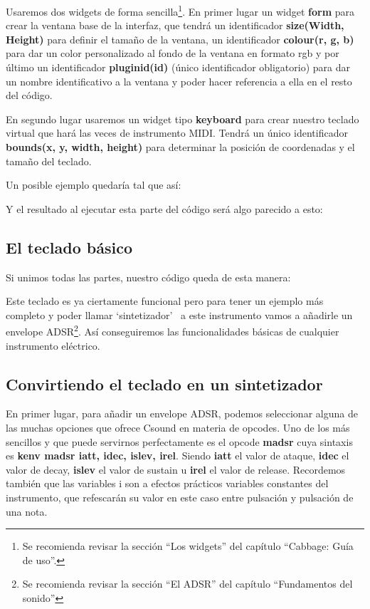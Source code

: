 Usaremos dos widgets de forma sencilla\footnote{Se recomienda revisar la sección ``Los widgets'' del capítulo ``Cabbage: Guía de uso''.}. En primer lugar un widget \textbf{form} para crear la ventana base de la interfaz, que tendrá un identificador \textbf{size(Width, Height)} para definir el tamaño de la ventana, un identificador \textbf{colour(r, g, b)} para dar un color personalizado al fondo de la ventana en formato rgb y por último un identificador \textbf{pluginid(id)} (único identificador obligatorio) para dar un nombre identificativo a la ventana y poder hacer referencia a ella en el resto del código.

En segundo lugar usaremos un widget tipo \textbf{keyboard} para crear nuestro teclado virtual que hará las veces de instrumento MIDI. Tendrá un único identificador \textbf{bounds(x, y, width, height)} para determinar la posición de coordenadas y el tamaño del teclado.

Un posible ejemplo quedaría tal que así:


\pagebreak
Y el resultado al ejecutar esta parte del código será algo parecido a esto:

 
\subsection{El teclado básico}\label{sec:SinteBasico}

Si unimos todas las partes, nuestro código queda de esta manera:


Este teclado es ya ciertamente funcional pero para tener un ejemplo más completo y poder llamar `sintetizador' \ a este instrumento vamos a añadirle un envelope ADSR\footnote{Se recomienda revisar la sección ``El ADSR'' del capítulo ``Fundamentos del sonido''}. Así conseguiremos las funcionalidades básicas de cualquier instrumento eléctrico.

\subsection{Convirtiendo el teclado en un sintetizador}\label{sec:SinteReal}

En primer lugar, para añadir un envelope ADSR, podemos seleccionar alguna de las muchas opciones que ofrece Csound en materia de opcodes. Uno de los más sencillos y que puede servirnos perfectamente es el opcode \textbf{madsr} cuya sintaxis es \textbf{kenv madsr iatt, idec, islev, irel}. Siendo \textbf{iatt} el valor de ataque, \textbf{idec} el valor de decay, \textbf{islev} el valor de sustain u \textbf{irel} el valor de release. Recordemos también que las variables i son a efectos prácticos variables constantes del instrumento, que refescarán su valor en este caso entre pulsación y pulsación de una nota.

